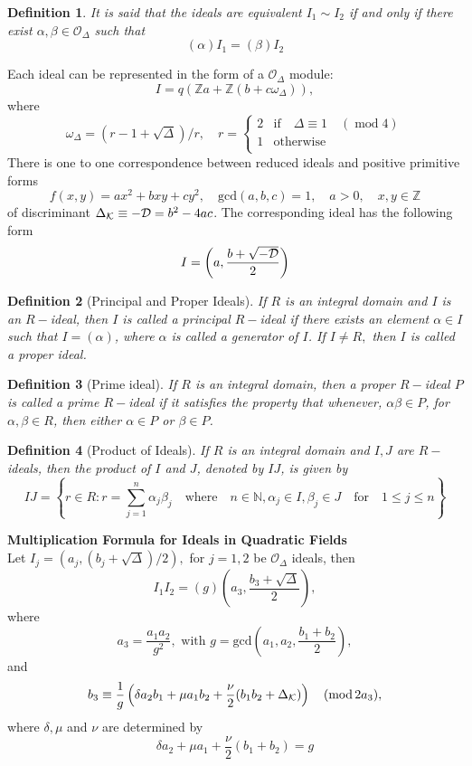 \documentclass[12pt, letterpaper]{report}
\newtheorem{definition}{Definition}
\begin{document}
\begin{definition}
It is said that the ideals are equivalent $I_{1}\sim I_{2}$ if and only if there exist $\alpha, \beta \in\mathcal{O}_{\Delta}$ such that 
$$
(\alpha)I_{1} = (\beta)I_{2}
$$
\end{definition}

Each ideal can be represented in the form of a $\mathcal{O}_{\Delta}$ module:
$$
I = q (\mathbb{Z} a + \mathbb{Z}(b + c\omega_{\Delta})),
$$
where
$$
\omega_{\Delta} = (r - 1 + \sqrt{\Delta})/r,\quad r = \left\{
                \begin{array}{ll}
                  2 &  \mathrm{if}\quad\Delta\equiv 1\quad (\mathop{\mathrm{mod}}4)\\
                  1 & \mathrm{otherwise}\\
                \end{array}
              \right.
$$
There is one to one correspondence between reduced ideals and positive primitive forms
$$
f(x, y) = a x^2 + b xy + c y ^ 2, \quad\mathrm{gcd}(a,b,c) = 1,\quad a > 0,\quad x, y \in\mathbb{Z}
$$
of discriminant $\Delta_{\cal{K}}\equiv -{\cal{D}} = b^2 - 4 a c$. The corresponding ideal has the following form
$$
I = \left(a, \frac{b + \sqrt{-\cal{D}}}{2}\right)
$$
\begin{definition}[Principal and Proper Ideals]
If $R$ is an integral domain and $I$ is an $R-$ideal, then $I$ is called a principal $R-$ideal
if there exists an element $\alpha\in I$ such that $I = (\alpha)$, where $\alpha$ is called a generator
of $I$. If $I \not = R,$ then $I$ is called a proper ideal.
\end{definition}
\begin{definition}[Prime ideal]
If $R$ is an integral domain, then a proper $R-$ideal $P$ is called a prime $R-$ideal if
it satisfies the property that whenever, $\alpha\beta \in P$, for $\alpha, \beta \in  R$, then either $\alpha \in P$ or $\beta \in P$.
\end{definition}
\begin{definition}[Product of Ideals]
If $R$ is an integral domain and $I, J$ are $R-$ideals, then the product of $I$ and $J$,
denoted by $IJ$, is given by
$$
IJ = \left\{r \in R : r = \sum_{j = 1}^{n}\alpha_{j}\beta_{j}\quad\mathrm{where}\quad n\in \mathbb{N}, \alpha_{j}\in I, \beta_{j}\in J\quad \mathrm{for}\quad 1\le j\le n \right\}
$$
\end{definition}
{\center\bf Multiplication Formula for Ideals in Quadratic Fields}\\
Let $I_{j} = (a_{j}, (b_{j} + \sqrt{\Delta})/2),$ for $j = 1,2$ be $\mathcal{O}_{\Delta}$ ideals, then
$$
I_{1}I_{2} = (g)\left(a_{3}, \frac{b_{3} + \sqrt{\Delta}}{2}\right),
$$
where 
$$
a_{3} = \frac{a_{1}a_{2}}{g^2},\mbox{ with } g = \mathrm{gcd}\left(a_{1}, a_{2}, \frac{b_{1} + b_{2}}{2}\right), 
$$
and\\
$$
b_{3}\equiv\frac{1}{g}\left(\delta a_{2}b_{1} +\mu a_{1}b_{2} + \frac{\nu}{2}(b_{1}b_{2}+ \Delta_{\cal K})\right)\quad(\mathop{\mathrm{mod}}2a_{3}),
$$
where $\delta, \mu$ and $\nu$ are determined by 
$$
\delta a_{2} + \mu a_{1} + \frac{\nu}{2}(b_{1} + b_{2}) = g
$$
\end{document}
